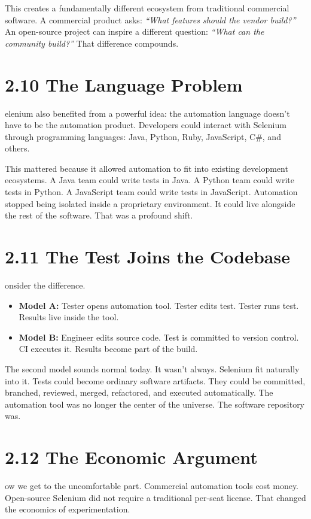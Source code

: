 \documentclass[11pt, a4paper, openany]{book}
\newcommand{\initialcap}[1]{{\fontfamily{lmss}\selectfont\huge\textbf{#1}}}
\begin{document}
This creates a fundamentally different ecosystem from traditional commercial software. A commercial product asks: \textit{``What features should the vendor build?''} An open-source project can inspire a different question: \textit{``What can the community build?''} That difference compounds.

\section{2.10 The Language Problem}
\noindent \initialcap{S}elenium also benefited from a powerful idea: the automation language doesn't have to be the automation product. Developers could interact with Selenium through programming languages: Java, Python, Ruby, JavaScript, C\#, and others.

This mattered because it allowed automation to fit into existing development ecosystems. A Java team could write tests in Java. A Python team could write tests in Python. A JavaScript team could write tests in JavaScript. Automation stopped being isolated inside a proprietary environment. It could live alongside the rest of the software. That was a profound shift.

\section{2.11 The Test Joins the Codebase}
\noindent \initialcap{C}onsider the difference.
\begin{itemize}
    \item \textbf{Model A:} Tester opens automation tool. Tester edits test. Tester runs test. Results live inside the tool.
    \item \textbf{Model B:} Engineer edits source code. Test is committed to version control. CI executes it. Results become part of the build.
\end{itemize}
The second model sounds normal today. It wasn't always. Selenium fit naturally into it. Tests could become ordinary software artifacts. They could be committed, branched, reviewed, merged, refactored, and executed automatically. The automation tool was no longer the center of the universe. The software repository was.

\section{2.12 The Economic Argument}
\noindent \initialcap{N}ow we get to the uncomfortable part. Commercial automation tools cost money. Open-source Selenium did not require a traditional per-seat license. That changed the economics of experimentation.
\end{document}
